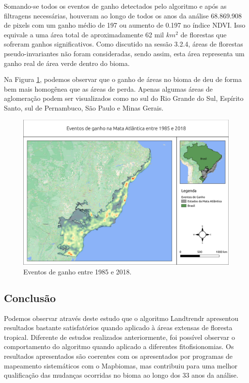 \hspace{13pt} Somando-se todos os eventos de ganho detectados pelo algoritmo e após as filtragens necessárias, houveram ao longo de todos os anos da análise 68.869.908 de pixels com um ganho médio de 197 ou aumento de 0.197 no índice NDVI. Isso equivale a uma área total de aproximadamente 62 mil $ km^2 $ de florestas que sofreram ganhos significativos. Como discutido na sessão 3.2.4, áreas de florestas pseudo-invariantes não foram consideradas, sendo assim, esta área representa um ganho real de área verde dentro do bioma. 

Na Figura \ref{fig:heat_gain}, podemos observar que o ganho de áreas no bioma de deu de forma bem mais homogênea que as áreas de perda. Apenas algumas áreas de aglomeração podem ser visualizados como no sul do Rio Grande do Sul, Espírito Santo, sul de Pernambuco, São Paulo e Minas Gerais.

\begin{figure}[H]
    \centering
    \includegraphics[scale=.5]{images/heatmap_gain_masked18_dur_gt4_inv_for.pdf}
    \caption{Eventos de ganho entre 1985 e 2018.}
    \label{fig:heat_gain}
\end{figure}

\subsection{Conclusão}

\hspace{13pt} Podemos observar através deste estudo que o algoritmo Landtrendr apresentou resultados bastante satisfatórios quando aplicado à áreas extensas de floresta tropical. Diferente de estudos realizados anteriormente, foi possível observar o comportamento do algoritmo quando aplicado a diferentes fitofisionomias. Os resultados apresentados são coerentes com os apresentados por programas de mapeamento sistemáticos com o Mapbiomas, mas contribuiu para uma melhor qualificação das mudanças ocorridas no bioma ao longo dos 33 anos da análise. 

